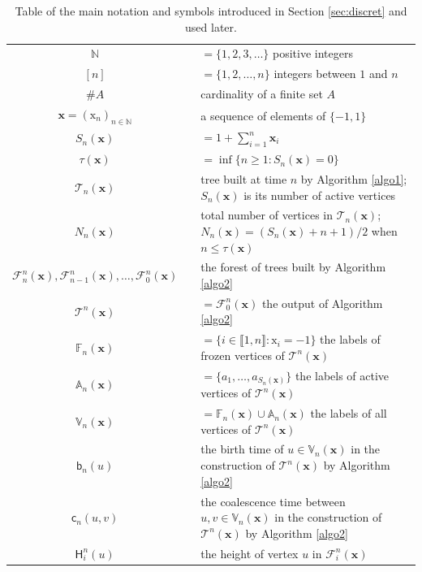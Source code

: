 \documentclass[11pt]{article}
\theoremstyle{plain}
\theoremstyle{definition}
\theoremstyle{remark}
\newcommand{\N}{\mathbb{N}} %
\newcommand{\1}{\mathbbm{1}} %
\newcommand{\T}{\mathcal{T}} %
\newcommand{\F}{\mathcal{F}} %
\newcommand{\birth}{\mathsf{b}} %
\newcommand{\coal}{\mathsf{c}} %
\renewcommand{\H}{\mathsf{H}} %
\newcommand{\Xb}{\mathrm{\mathbf{x}}} %
\newcommand{\X}{\mathrm x} %
\newcommand{\V}{\mathbb{V}} %
\newcommand{\Fbb}{\mathbb{F}} %
\newcommand{\A}{\mathbb{A}} %
\begin{document}
\begin{table}[htbp]\caption{Table of the main notation and symbols introduced in Section \ref{sec:discret} and used later.}
\centering
\begin{tabular}{c c p{12cm} }
\toprule
$\N$ && $=\{1,2,3,\dots\}$ positive integers\\
$[n]$ && $=\{1,2,\dots,n\}$ integers between $1$ and $n$\\
$\#A$ && cardinality of a finite set $A$\\
\hline
$\Xb = (\X_n)_{n\in\N}$ && a sequence of elements of $\{-1,1\}$\\
$S_n(\Xb)$ && $=1+\sum_{i=1}^n \Xb_i$\\
$\tau(\Xb)$ && $=\inf \{n \geq 1 : S_{n}(\Xb)=0\}$ \\
\hline
$\T_n(\Xb)$ && tree built at time $n$ by Algorithm \ref{algo1}; $S_{n}(\Xb)$ is its number of active vertices \\
$N_n(\Xb)$ && total number of vertices in $\T_n(\Xb)$; $N_n(\Xb)=(S_n(\Xb)+n+1)/2$ when $n \leq \tau(\Xb)$\\
\hline
$\F_n^n(\Xb),\F_{n-1}^n(\Xb), \ldots, \F_0^n(\Xb)$ && the forest of trees built by Algorithm \ref{algo2}\\

$\T^n(\Xb)$ && $=\F_0^n(\Xb)$ the output of Algorithm \ref{algo2}\\
\hline
$\Fbb_{n}(\Xb)$ && $=\{i\in\llbracket 1,n \rrbracket: \X_{i}=-1\}$ the labels of frozen vertices of $\T^n(\Xb)$\\

$\A_{n}(\Xb)$ && $=\{a_{1},\ldots,a_{S_{n}(\Xb)}\}$ the labels of active vertices of $\T^n(\Xb)$\\

$\V_{n}(\Xb)$ && $=\Fbb_{n}(\Xb)\cup\A_{n}(\Xb)$ the labels of all vertices of $\T^n(\Xb)$\\
\hline
$\birth_n(u)$ && the birth time of $u \in \V_{n}(\Xb)$ in the construction of $\T^n(\Xb)$  by Algorithm \ref{algo2} \\

$\coal_{n}(u,v)$ && the coalescence time between $u,v \in \V_{n}(\Xb)$ in the construction of $\T^n(\Xb)$  by Algorithm \ref{algo2} \\
\hline
 $\H^n_i(u)$  && the height of vertex $u$ in $\F^n_i(\Xb)$\\
\bottomrule
\end{tabular}
\label{tab:secdiscret}
\end{table}
\end{document}
